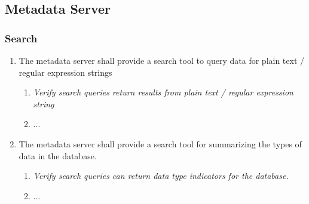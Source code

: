 \subsection{Metadata Server}
\label{sec:metadata_spec} 

\subsubsection{Search}
	\begin{enumerate}
		\item The metadata server shall provide a search tool to query data for plain text / regular expression strings

		\begin{enumerate}
			\item \textit{Verify search queries return results from plain text / regular expression string}
			\item ...
		\end{enumerate}

		\item The metadata server shall provide a search tool for summarizing the types of data in the database.
		\begin{enumerate}
			\item \textit{Verify search queries can return data type indicators for the database.}
		\item ...
		\end{enumerate}

	\end{enumerate}
